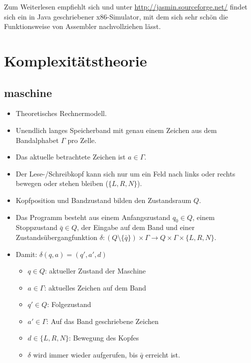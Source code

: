 Zum Weiterlesen empfiehlt sich \cite{wikibook:AsmProgr} und unter \url{http://jasmin.sourceforge.net/} findet sich ein in Java geschriebener x86-Simulator, mit dem sich sehr schön die Funktionsweise von Assembler nachvollziehen lässt.


\chapter{Komplexitätstheorie}


\section{\protect{}maschine}

\begin{itemize}
  \item Theoretisches Rechnermodell.
  \item Unendlich langes Speicherband mit genau einem Zeichen aus dem Bandalphabet $\Gamma$ pro Zelle.
  \item Das aktuelle betrachtete Zeichen ist $a\in\Gamma$.
  \item Der Lese-/Schreibkopf kann sich nur um ein Feld nach links oder rechts bewegen oder stehen bleiben ($\{L,R,N\}$).
  \item {}Kopfposition und Bandzustand bilden den Zustandsraum $Q$.
  \item Das Programm besteht aus einem Anfangszustand $q_0\in Q$, einem Stoppzustand $\bar{q}\in Q$, der Eingabe auf dem Band und einer Zustandsübergangfunktion $\delta:(Q\setminus\{\bar{q}\})\times\Gamma\rightarrow Q\times\Gamma\times\{L,R,N\}$.
  \item Damit: $\delta(q,a)=(q',a',d)$
	\begin{itemize}
	  \item $q\in Q$: aktueller Zustand der Maschine
	  \item $a\in\Gamma$: aktuelles Zeichen auf dem Band
	  \item $q'\in Q$: Folgezustand
	  \item $a'\in\Gamma$: Auf das Band geschriebene Zeichen
	  \item $d\in\{L,R,N\}$: Bewegung des Kopfes
	  \item $\delta$ wird immer wieder aufgerufen, bis $\bar{q}$ erreicht ist.
	\end{itemize}
\end{itemize}

